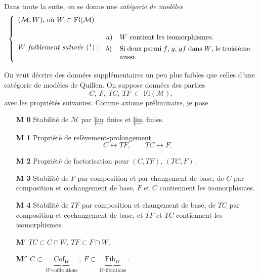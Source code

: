 \documentclass[11pt]{article}
\newcommand{\printedpage}[1]{\marginpar{\footnotesize p.~#1}}
\newcommand{\msp}[1]{\marginpar{\footnotesize [#1]}}
\newcommand{\cM}{\mathcal{M}}
\newcommand{\Fl}{\mathrm{Fl}}
\newcommand{\Cof}{\mathrm{Cof}}
\newcommand{\Fib}{\mathrm{Fib}}
\begin{document}
Dans toute la suite, on se donne une \textit{catégorie de modèles}
\[
\left\{
\begin{array}{ll}
\mbox{$(\cM,W)$, où $W\subset\Fl(\cM)$} & \\[3ex]
\mbox{\textit{$W$ faiblement saturée} (\footnotemark) :} &
\begin{array}[c]{@{}l@{\quad}p{6.5cm}@{}}
a) & $W$ contient les isomorphismes.\\[1ex]
b) & Si deux parmi $f$, $g$, $gf$ dans $W$, le troisième aussi.
\end{array}
\end{array}
\right.
\]

\printedpage{5}
On veut décrire des données supplémentaires un peu plus faibles que celles d'une catégorie de modèles de Quillen. On suppose données des parties
\[
C,\ F,\ TC,\ TF\ \subset\ \Fl(\cM),
\]
avec les propriétés suivantes. Comme axiome préliminaire, je pose

\begin{itemize}[leftmargin=3em,labelsep=0.6em]
\item[\textbf{M 0}] Stabilité de $\cM$ par $\varprojlim$ finies et $\varprojlim$ finies.

\item[\textbf{M 1}]\msp{page 8}Propriété de relèvement-prolongement
\[
C\longleftrightarrow TF,\qquad TC\longleftrightarrow F.
\]

\item[\textbf{M 2}] Propriété de factorisation pour $(C,TF)$, $(TC,F)$.

\item[\textbf{M 3}] Stabilité de $F$ par composition et par changement de base, de $C$ par composition et cochangement de base, $F$ et $C$ contiennent les isomorphismes.

\item[\textbf{M 4}] Stabilité de $TF$ par composition et changement de base, de $TC$ par composition et cochangement de base, et $TF$ et $TC$ contiennent les isomorphismes.

\item[\textbf{M}$'$] $TC\subset C\cap W$, $TF\subset F\cap W$.

\item[\textbf{M}$''$] $C\subset\ \underbrace{\Cof_W}_{\text{$W$-cofibrations}}\ ,\ F\subset\ \underbrace{\Fib_W}_{\text{$W$-fibrations}}\ .$
\end{itemize}
\end{document}

